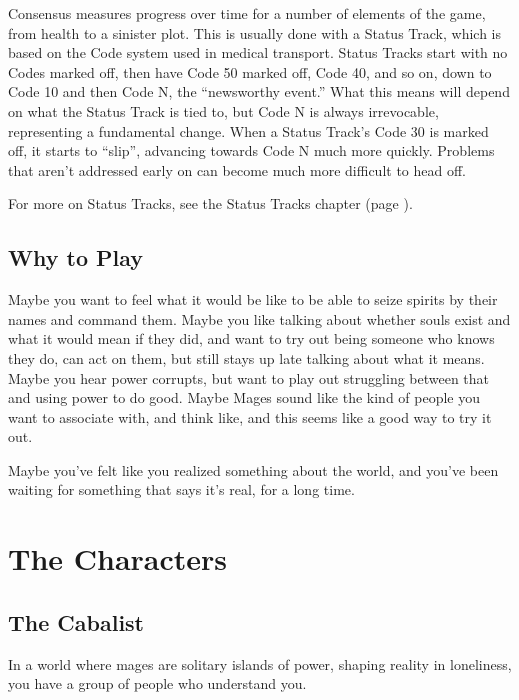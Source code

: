 \documentclass[
]{memoir}
\begin{document}
Consensus measures progress over time for a number of elements of the
game, from health to a sinister plot. This is usually done with a Status
Track, which is based on the Code system used in medical transport.
Status Tracks start with no Codes marked off, then have Code 50 marked
off, Code 40, and so on, down to Code 10 and then Code N, the
``newsworthy event.'' What this means will depend on what the Status
Track is tied to, but Code N is always irrevocable, representing a
fundamental change. When a Status Track's Code 30 is marked off, it
starts to ``slip'', advancing towards Code N much more quickly. Problems
that aren't addressed early on can become much more difficult to head
off.

For more on Status Tracks, see the Status Tracks chapter (page \pageref{Status Tracks chapter}).

\hypertarget{why-to-play}{%
\section{Why to Play}\label{why-to-play}}

Maybe you want to feel what it would be like to be able to seize spirits
by their names and command them. Maybe you like talking about whether
souls exist and what it would mean if they did, and want to try out
being someone who knows they do, can act on them, but still stays up
late talking about what it means. Maybe you hear power corrupts, but
want to play out struggling between that and using power to do good.
Maybe Mages sound like the kind of people you want to associate with,
and think like, and this seems like a good way to try it out.

Maybe you've felt like you realized something about the world, and
you've been waiting for something that says it's real, for a long time.

\newpage

\hypertarget{the-characters}{%
\chapter{The Characters}\label{the-characters}}

\hypertarget{the-cabalist}{%
\section{The Cabalist}\label{the-cabalist}}

In a world where mages are solitary islands of power, shaping reality in
loneliness, you have a group of people who understand you.
\end{document}
